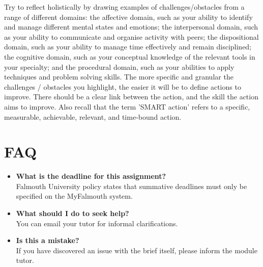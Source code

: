 \documentclass{../../fal_assignment_opendyslexic}
\begin{document}
Try to reflect holistically by drawing examples of challenges/obstacles from a range of different domains: the affective domain, such as your ability to identify and manage different mental states and emotions; the interpersonal domain, such as your ability to communicate and organise activity with peers; the dispositional domain, such as your ability to manage time effectively and remain disciplined; the cognitive domain, such as your conceptual knowledge of the relevant tools in your specialty; and the procedural domain, such as your abilities to apply techniques and problem solving skills. The more specific and granular the challenges / obstacles you highlight, the easier it will be to define actions to improve. There should be a clear link between the action, and the skill the action aims to improve. Also recall that the term ’SMART action’ refers to a specific, measurable, achievable, relevant, and time-bound action.

\pagebreak
\section*{FAQ}

\begin{itemize}
	\item 	\textbf{What is the deadline for this assignment?} \\ 
    		Falmouth University policy states that summative deadlines must only be specified on the MyFalmouth system.
	\item 	\textbf{What should I do to seek help?} \\ 
    		You can email your tutor for informal clarifications.    		
    	\item 	\textbf{Is this a mistake?} \\ 	
    		If you have discovered an issue with the brief itself, please inform the module tutor.
\end{itemize}
\end{document}
